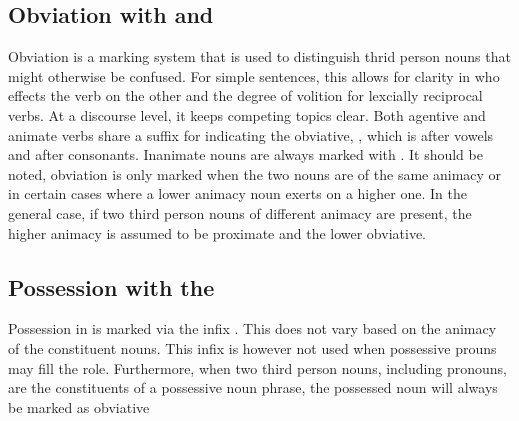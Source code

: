   \vertspace

  \subsection{Obviation with \suffixtext{\agtconsobv} and \suffixtext{\inanobv}}
  Obviation is a marking system that is used to distinguish thrid person nouns that might otherwise be confused.  For simple sentences, this allows for clarity in who effects the verb on the other and the degree of volition for lexcially reciprocal verbs. At a discourse level, it keeps competing topics clear. Both agentive and animate verbs share a suffix for indicating the obviative, \suffixtext{\agtobv}, which is \suffixtext{\agtvowelobv} after vowels and \suffixtext{\agtconsobv} after consonants. Inanimate nouns are always marked with \suffixtext{\inanobv}.
  It should be noted, obviation is only marked when the two nouns are of the same animacy or in certain cases where a lower animacy noun exerts on a higher one. In the general case, if two third person nouns of different animacy are present, the higher animacy is assumed to be proximate and the lower obviative.

  \subsection{Possession with the \infixtext{\possessive}}
  Possession in \langname is marked via the infix \infixtext{\possessive}. This does not vary based on the animacy of the constituent nouns. This infix is however not used when possessive prouns may fill the role. Furthermore, when two third person nouns, including pronouns, are the constituents of a possessive noun phrase, the possessed noun will always be marked as obviative


